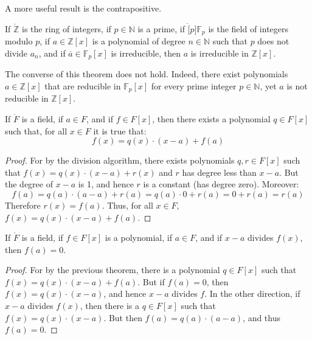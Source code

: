 \documentclass{article}                                                        %
\begin{document}
        A more useful result is the contrapositive.
        \begin{theorem}
            If $\ring{\mathbb{Z}}$ is the ring of integers, if
            $p\in\mathbb{N}$ is a prime, if $\ring[p]{\mathbb{F}_{p}}$ is the
            field of integers modulo $p$, if $a\in\mathbb{Z}[x]$ is a polynomial
            of degree $n\in\mathbb{N}$ such that $p$ does not divide $a_{n}$,
            and if $\overline{a}\in\mathbb{F}_{p}[x]$ is irreducible, then
            $a$ is irreducible in $\mathbb{Z}[x]$.
        \end{theorem}
        The converse of this theorem does not hold. Indeed, there exist
        polynomials $a\in\mathbb{Z}[x]$ that are reducible in
        $\mathbb{F}_{p}[x]$ for every prime integer $p\in\mathbb{N}$, yet $a$
        is not reducible in $\mathbb{Z}[x]$.
        \begin{theorem}
            If $\ring{F}$ is a field, if $a\in{F}$, and if $f\in{F}[x]$, then
            there exists a polynomial $q\in{F}[x]$ such that, for all
            $x\in{F}$ it is true that:
            \begin{equation}
                f(x)=q(x)\cdot(x-a)+f(a)
            \end{equation}
        \end{theorem}
        \begin{proof}
            For by the division algorithm, there exists polynomials
            $q,r\in{F}[x]$ such that $f(x)=q(x)\cdot(x-a)+r(x)$ and $r$ has
            degree less than $x-a$. But the degree of $x-a$ is 1, and hence
            $r$ is a constant (has degree zero). Moreover:
            \begin{equation}
                f(a)=q(a)\cdot(a-a)+r(a)=q(a)\cdot{0}+r(a)=0+r(a)=r(a)
            \end{equation}
            Therefore $r(x)=f(a)$. Thus, for all $x\in{F}$,
            $f(x)=q(x)\cdot(x-a)+f(a)$.
        \end{proof}
        \begin{theorem}
            If $\ring{F}$ is a field, if $f\in{F}[x]$ is a polynomial, if
            $a\in{F}$, and if $x-a$ divides $f(x)$, then $f(a)=0$.
        \end{theorem}
        \begin{proof}
            For by the previous theorem, there is a polynomial $q\in{F}[x]$
            such that $f(x)=q(x)\cdot(x-a)+f(a)$. But if $f(a)=0$, then
            $f(x)=q(x)\cdot(x-a)$, and hence $x-a$ divides $f$. In the other
            direction, if $x-a$ divides $f(x)$, then there is a $q\in{F}[x]$
            such that $f(x)=q(x)\cdot(x-a)$. But then $f(a)=q(a)\cdot(a-a)$,
            and thus $f(a)=0$.
        \end{proof}
\end{document}
